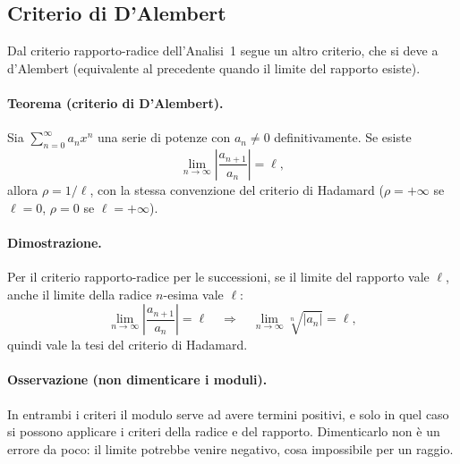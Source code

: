 \subsection{Criterio di D'Alembert}

Dal criterio rapporto-radice dell'Analisi~1 segue un altro criterio, che si
deve a d'Alembert (equivalente al precedente quando il limite del rapporto
esiste).

\paragraph{Teorema (criterio di D'Alembert).} Sia $\sum_{n=0}^{\infty}a_nx^n$
una serie di potenze con $a_n\neq0$ definitivamente. Se esiste
\[
  \lim_{n\to\infty}\left|\frac{a_{n+1}}{a_n}\right|=\ell ,
\]
allora $\rho=1/\ell$, con la stessa convenzione del criterio di Hadamard
($\rho=+\infty$ se $\ell=0$, $\rho=0$ se $\ell=+\infty$).

\paragraph{Dimostrazione.}
Per il criterio rapporto-radice per le successioni, se il limite del rapporto
vale $\ell$, anche il limite della radice $n$-esima vale $\ell$:
\[
  \lim_{n\to\infty}\left|\frac{a_{n+1}}{a_n}\right|=\ell
  \quad\Longrightarrow\quad
  \lim_{n\to\infty}\sqrt[n]{|a_n|}=\ell ,
\]
quindi vale la tesi del criterio di Hadamard.

\paragraph{Osservazione (non dimenticare i moduli).} In entrambi i criteri il
modulo serve ad avere termini positivi, e solo in quel caso si possono
applicare i criteri della radice e del rapporto.
Dimenticarlo non è un errore da poco: il limite potrebbe venire negativo, cosa
impossibile per un raggio.

